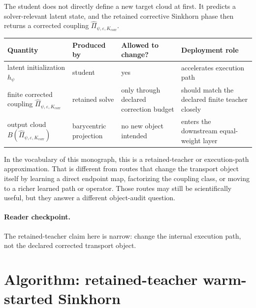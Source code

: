 The student does not directly define a new target cloud at first.  It predicts a
solver-relevant latent state, and the retained corrective Sinkhorn phase then
returns a corrected coupling
\(\widehat\Pi_{\psi,\varepsilon,K_{\mathrm{corr}}}\).

\begin{center}
\small
\begin{tabular}{p{} p{} p{} p{}}
\toprule
Quantity & Produced by & Allowed to change? & Deployment role \\
\midrule
latent initialization \(h_\psi\) & student & yes & accelerates execution path \\
finite corrected coupling \(\widehat\Pi_{\psi,\varepsilon,K_{\mathrm{corr}}}\) & retained solve & only through declared correction budget & should match the declared finite teacher closely \\
output cloud \(B(\widehat\Pi_{\psi,\varepsilon,K_{\mathrm{corr}}})\) & barycentric projection & no new object intended & enters the downstream equal-weight layer \\
\bottomrule
\end{tabular}
\end{center}

In the vocabulary of this monograph, this is a retained-teacher or
execution-path approximation.  That is different from routes that change the
transport object itself by learning a direct endpoint map, factorizing the
coupling class, or moving to a richer learned path or operator.  Those routes
may still be scientifically useful, but they answer a different object-audit
question.

\paragraph{Reader checkpoint.}
The retained-teacher claim here is narrow: change the internal execution path,
not the declared corrected transport object.

\section{Algorithm: retained-teacher warm-started Sinkhorn}
\label{sec:bf-learned-ot-teacher}

